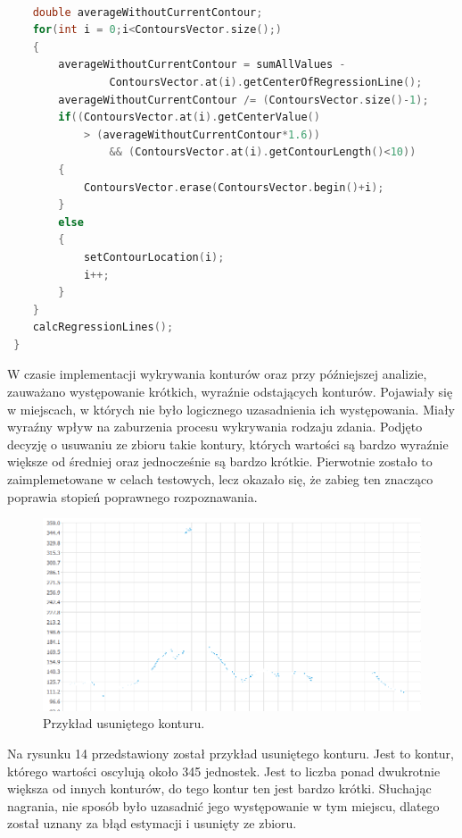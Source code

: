 \documentclass[a4paper,12 pt]{article}
\begin{document}
\begin{lstlisting}[caption={Dalsza część głównej funkcji findContours},label={lst:label},language=C++]

    double averageWithoutCurrentContour;
    for(int i = 0;i<ContoursVector.size();)
    {
        averageWithoutCurrentContour = sumAllValues - 
        		ContoursVector.at(i).getCenterOfRegressionLine();
        averageWithoutCurrentContour /= (ContoursVector.size()-1);
        if((ContoursVector.at(i).getCenterValue() 
        	> (averageWithoutCurrentContour*1.6))
                && (ContoursVector.at(i).getContourLength()<10))
        {
            ContoursVector.erase(ContoursVector.begin()+i);
        }
        else
        {
            setContourLocation(i);
            i++;
        }
    }
    calcRegressionLines();
 }
\end{lstlisting}
W czasie implementacji wykrywania konturów oraz przy późniejszej analizie, zauważano występowanie krótkich, wyraźnie odstających konturów. Pojawiały się w miejscach, w których nie było logicznego uzasadnienia ich występowania. Miały wyraźny wpływ na zaburzenia procesu wykrywania rodzaju zdania.
Podjęto decyzję o usuwaniu ze zbioru takie kontury, których wartości są bardzo wyraźnie większe od średniej oraz jednocześnie są bardzo krótkie. Pierwotnie zostało to zaimplemetowane w celach testowych, lecz okazało się, że zabieg ten znacząco poprawia stopień poprawnego rozpoznawania.
 \FloatBarrier
\begin{figure}[h]
\centering
\includegraphics[scale=0.7]{usuniety_kontur.png}
\caption{Przykład usuniętego konturu.}
\end{figure}
\FloatBarrier
Na rysunku 14 przedstawiony został przykład usuniętego konturu. Jest to kontur, którego wartości oscylują około 345 jednostek. Jest to liczba ponad dwukrotnie większa od innych konturów, do tego kontur ten jest bardzo krótki.
Słuchając nagrania, nie sposób było uzasadnić jego występowanie w tym miejscu, dlatego został uznany za błąd estymacji i usunięty ze zbioru. 
\end{document}

